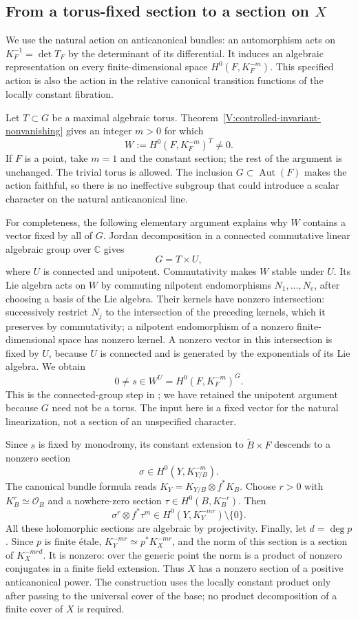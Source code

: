 \subsection{From a torus-fixed section to a section on \texorpdfstring{$X$}{X}}

We use the natural action on anticanonical bundles: an automorphism
acts on $K_F^{-1}=\det T_F$ by the determinant of its differential.
It induces an algebraic representation on every finite-dimensional
space $H^0(F,K_F^{-m})$.  This specified action is also the action in
the relative canonical transition functions of the locally constant
fibration.

Let $T\subset G$ be a maximal algebraic torus.  Theorem~\ref{V:controlled-invariant-nonvanishing}
gives an integer $m>0$ for which
\[
 W:=H^0(F,K_F^{-m})^T\ne0.
\]
If $F$ is a point, take $m=1$ and the constant section; the rest of the
argument is unchanged.  The trivial torus is allowed.  The inclusion
$G\subset\operatorname{Aut}(F)$ makes the action faithful, so there
is no ineffective subgroup that could introduce a scalar character
on the natural anticanonical line.

For completeness, the following elementary argument explains why
$W$ contains a vector fixed by all of $G$.  Jordan decomposition in a
connected commutative linear algebraic group over $\mathbb C$ gives
\[
 G=T\times U,
\]
where $U$ is connected and unipotent.  Commutativity makes $W$ stable
under $U$.  Its Lie algebra acts on $W$ by commuting nilpotent
endomorphisms $N_1,\ldots,N_e$, after choosing a basis of the Lie
algebra.  Their kernels have nonzero intersection: successively
restrict $N_j$ to the intersection of the preceding kernels, which
it preserves by commutativity; a nilpotent endomorphism of a nonzero
finite-dimensional space has nonzero kernel.  A nonzero vector in
this intersection is fixed by $U$, because $U$ is connected and is
generated by the exponentials of its Lie algebra.  We obtain
\[
 0\ne s\in W^U=H^0(F,K_F^{-m})^G.
\]
This is the connected-group step in
\cite[Lemma~2.3 and the proof of Theorem~2.2]{Muller2025}; we have
retained the unipotent argument because $G$ need not be a torus.
The input here is a fixed vector for the natural linearization, not
a section of an unspecified character.

Since $s$ is fixed by monodromy, its constant extension to
$\widetilde B\times F$ descends to a nonzero section
\[
 \sigma\in H^0(Y,K_{Y/B}^{-m}).
\]
The canonical bundle formula reads
$K_Y=K_{Y/B}\otimes f^*K_B$.  Choose $r>0$ with
$K_B^r\simeq\mathcal O_B$ and a nowhere-zero section
$\tau\in H^0(B,K_B^{-r})$.  Then
\[
 \sigma^r\otimes f^*\tau^m
 \in H^0(Y,K_Y^{-mr})\setminus\{0\}.
\]
All these holomorphic sections are algebraic by projectivity.  Finally,
let $d=\deg p$.  Since $p$ is finite \'etale,
$K_Y^{-mr}\simeq p^*K_X^{-mr}$, and the norm of this section is a
section of $K_X^{-mrd}$.  It is nonzero: over the generic point the
norm is a product of nonzero conjugates in a finite field extension.
Thus $X$ has a nonzero section of a positive anticanonical power.
The construction uses the locally constant product only after passing
to the universal cover of the base; no product decomposition of a
finite cover of $X$ is required.
